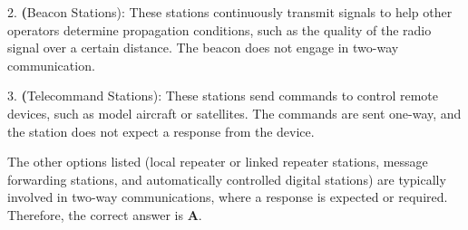 2. \textbf(Beacon Stations): These stations continuously transmit signals to help other operators determine propagation conditions, such as the quality of the radio signal over a certain distance. The beacon does not engage in two-way communication.

3. \textbf(Telecommand Stations): These stations send commands to control remote devices, such as model aircraft or satellites. The commands are sent one-way, and the station does not expect a response from the device.

The other options listed (local repeater or linked repeater stations, message forwarding stations, and automatically controlled digital stations) are typically involved in two-way communications, where a response is expected or required. Therefore, the correct answer is \textbf{A}.


